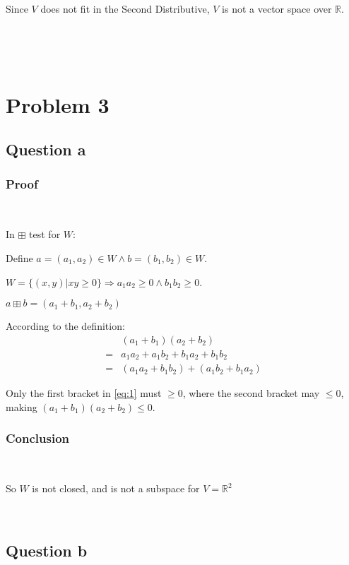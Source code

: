 \documentclass{article}
\def\R{\mathbb{R}}
\begin{document}
~

Since $V$ does not fit in the Second Distributive, $V$ is not a vector space over $\R$.

~

~

\section{Problem 3}

\subsection{Question a}

\subsubsection{Proof}

~

In $\boxplus$ test for $W$:

Define $a=(a_1,a_2) \in W \land b=(b_1,b_2) \in W$.

$W=\{ (x,y) | xy \geqslant 0 \} \Rightarrow a_1 a_2 \geqslant 0 \land b_1 b_2 \geqslant 0$.

$a \boxplus b= (a_1+b_1,a_2+b_2)$

According to the definition: 
\begin{equation}
\tag{3.1.1-1}
\label{eq:1}
\begin{split}
&(a_1+b_1)(a_2+b_2) \\
= & a_1 a_2+a_1 b_2+b_1 a_2+b_1 b_2\\
= & (a_1 a_2+b_1 b_2)+(a_1 b_2+b_1 a_2)
\end{split}
\end{equation}

Only the first bracket in \ref{eq:1} must $\geqslant 0$, where the second bracket may $\leqslant 0$, making $(a_1+b_1)(a_2+b_2) \leqslant 0$.

\subsubsection{Conclusion}

~

So $W$ is not closed, and is not a subspace for $V=\R^2$

~

\subsection{Question b}
\end{document}
